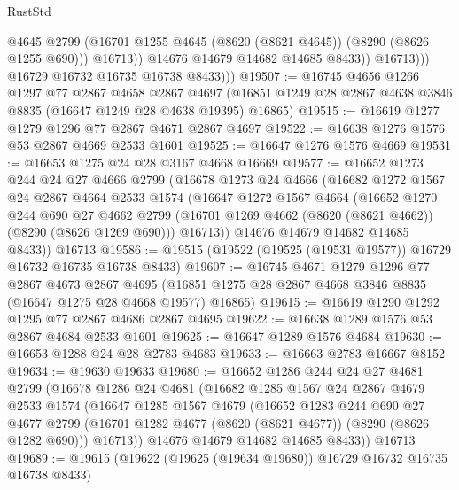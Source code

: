 \begin{lexlean}{RustStd}
\begin{coremodule}
                        @4645
                        @2799
                        (@16701 @1255 @4645 (@8620 (@8621 @4645)) (@8290 (@8626 @1255 @690)))
                        @16713))
                    @14676
                    @14679
                    @14682
                    @14685
                    @8433))
                @16713)))
          @16729
          @16732
          @16735
          @16738
          @8433)))
@19507 := @16745
    @4656
    @1266
    @1297
    @77
    @2867
    @4658
    @2867
    @4697
    (@16851 @1249 @28 @2867 @4638 @3846 @8835 (@16647 @1249 @28 @4638 @19395) @16865)
@19515 := @16619 @1277 @1279 @1296 @77 @2867 @4671 @2867 @4697
@19522 := @16638 @1276 @1576 @53 @2867 @4669 @2533 @1601
@19525 := @16647 @1276 @1576 @4669
@19531 := @16653 @1275 @24 @28 @3167 @4668 @16669
@19577 := @16652
    @1273
    @244
    @24
    @27
    @4666
    @2799
    (@16678
      @1273
      @24
      @4666
      (@16682
        @1272
        @1567
        @24
        @2867
        @4664
        @2533
        @1574
        (@16647
          @1272
          @1567
          @4664
          (@16652
            @1270
            @244
            @690
            @27
            @4662
            @2799
            (@16701 @1269 @4662 (@8620 (@8621 @4662)) (@8290 (@8626 @1269 @690)))
            @16713))
        @14676
        @14679
        @14682
        @14685
        @8433))
    @16713
@19586 := @19515 (@19522 (@19525 (@19531 @19577)) @16729 @16732 @16735 @16738 @8433)
@19607 := @16745
    @4671
    @1279
    @1296
    @77
    @2867
    @4673
    @2867
    @4695
    (@16851 @1275 @28 @2867 @4668 @3846 @8835 (@16647 @1275 @28 @4668 @19577) @16865)
@19615 := @16619 @1290 @1292 @1295 @77 @2867 @4686 @2867 @4695
@19622 := @16638 @1289 @1576 @53 @2867 @4684 @2533 @1601
@19625 := @16647 @1289 @1576 @4684
@19630 := @16653 @1288 @24 @28 @2783 @4683
@19633 := @16663 @2783 @16667 @8152
@19634 := @19630 @19633
@19680 := @16652
    @1286
    @244
    @24
    @27
    @4681
    @2799
    (@16678
      @1286
      @24
      @4681
      (@16682
        @1285
        @1567
        @24
        @2867
        @4679
        @2533
        @1574
        (@16647
          @1285
          @1567
          @4679
          (@16652
            @1283
            @244
            @690
            @27
            @4677
            @2799
            (@16701 @1282 @4677 (@8620 (@8621 @4677)) (@8290 (@8626 @1282 @690)))
            @16713))
        @14676
        @14679
        @14682
        @14685
        @8433))
    @16713
@19689 := @19615 (@19622 (@19625 (@19634 @19680)) @16729 @16732 @16735 @16738 @8433)

\end{coremodule}
\end{lexlean}
